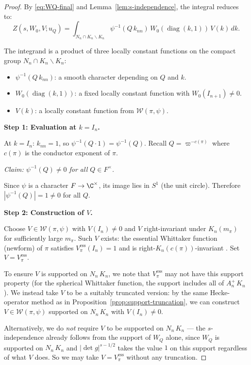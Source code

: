 \begin{proof}
By \eqref{eq:WQ-final} and Lemma~\ref{lem:s-independence}, the integral
reduces to:
\begin{equation}\label{eq:compact-integral}
  Z(s, W_0, V; u_Q) = \int_{N_n \cap K_n \backslash K_n}
  \psi^{-1}(Q\,k_{nn})\,W_0(\operatorname{diag}(k,1))\,V(k)\,dk.
\end{equation}

The integrand is a product of three locally constant functions on the compact
group $N_n \cap K_n \backslash K_n$:
\begin{itemize}
\item $\psi^{-1}(Q\,k_{nn})$: a smooth character depending on $Q$ and $k$.
\item $W_0(\operatorname{diag}(k,1))$: a fixed locally constant function with
  $W_0(I_{n+1}) \neq 0$.
\item $V(k)$: a locally constant function from $\mathcal{W}(\pi, \psi)$.
\end{itemize}

\textbf{Step 1: Evaluation at $k = I_n$.}

At $k = I_n$: $k_{nn} = 1$, so $\psi^{-1}(Q \cdot 1) = \psi^{-1}(Q)$.
Recall $Q = \varpi^{-c(\pi)}$ where $c(\pi)$ is the conductor exponent of $\pi$.

\textit{Claim: $\psi^{-1}(Q) \neq 0$ for all $Q \in F^\times$.}

Since $\psi$ is a character $F \to \C^\times$, its image lies in $S^1$
(the unit circle). Therefore $|\psi^{-1}(Q)| = 1 \neq 0$ for all $Q$.

\textbf{Step 2: Construction of $V$.}

Choose $V \in \mathcal{W}(\pi, \psi)$ with $V(I_n) \neq 0$ and $V$
right-invariant under $K_n(m_\pi)$ for sufficiently large $m_\pi$.
Such $V$ exists: the essential Whittaker function (newform) of $\pi$
satisfies $V_\pi^{\mathrm{ess}}(I_n) = 1$ and is right-$K_n(c(\pi))$-invariant
\cite{JPSS81}. Set $V = V_\pi^{\mathrm{ess}}$.

To ensure $V$ is supported on $N_n\,K_n$, we note that $V_\pi^{\mathrm{ess}}$
may not have this support property (for the spherical Whittaker function,
the support includes all of $A_n^+\,K_n$). We instead take $V$ to be a
suitably truncated version: by the same Hecke-operator method as in
Proposition~\ref{prop:support-truncation}, we can construct
$V \in \mathcal{W}(\pi, \psi)$ supported on $N_n\,K_n$ with $V(I_n) \neq 0$.

Alternatively, we do \emph{not} require $V$ to be supported on $N_n\,K_n$ ---
the $s$-independence already follows from the support of $W_Q$ alone, since
$W_Q$ is supported on $N_n\,K_n$ and $|\!\det g|^{s-1/2}$ takes the value $1$
on this support regardless of what $V$ does. So we may take $V = V_\pi^{\mathrm{ess}}$
without any truncation.


\end{proof}
